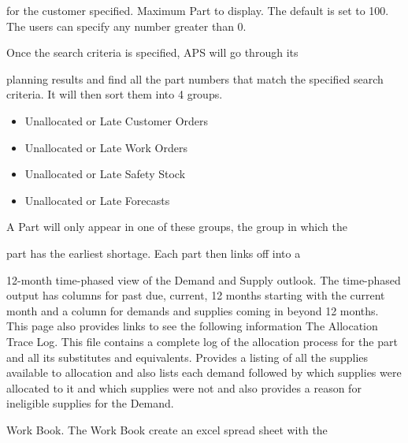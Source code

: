 \documentclass[letterpaper,10pt,english]{sphinxmanual}
\begin{document}
for the customer specified.
\textbar{} Maximum Part to display. The default is set to 100. The users can
specify any number greater than 0.

\begin{DUlineblock}{0em}
\item[] Once the search criteria is specified, APS will go through its
\end{DUlineblock}

planning
\textbar{} results and find all the part numbers that match the specified search
\textbar{} criteria. It will then sort them into 4 groups.
\begin{itemize}
\item {} 
Unallocated or Late Customer Orders

\item {} 
Unallocated or Late Work Orders

\item {} 
Unallocated or Late Safety Stock

\item {} 
Unallocated or Late Forecasts

\end{itemize}

\begin{DUlineblock}{0em}
\item[] A Part will only appear in one of these groups, the group in which the
\item[] part has the earliest shortage. Each part then links off into a
\end{DUlineblock}

12-month
\textbar{} time-phased view of the Demand and Supply outlook. The time-phased
\textbar{} output has columns for past due, current, 12 months starting with the
\textbar{} current month and a column for demands and supplies coming in beyond
12
\textbar{} months. This page also provides links to see the following information
\textbar{} The Allocation Trace Log. This file contains a complete log of the
\textbar{} allocation process for the part and all its substitutes and
equivalents.
\textbar{} Provides a listing of all the supplies available to allocation and
also
\textbar{} lists each demand followed by which supplies were allocated to it and
\textbar{} which supplies were not and also provides a reason for ineligible
\textbar{} supplies for the Demand.

\begin{DUlineblock}{0em}
\item[] Work Book. The Work Book create an excel spread sheet with the
\end{DUlineblock}
\end{document}
